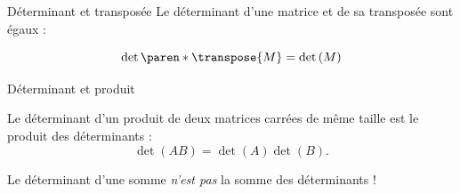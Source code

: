 \begin{frame}{Déterminant et transposée}
  Le déterminant d'une matrice et de sa transposée sont égaux :
  \begin{proposition}
    \begin{equation*}
      \det\paren*{\transpose{M}} = \det{(M)}
    \end{equation*}
  \end{proposition}
\end{frame}
\begin{frame}{Déterminant et produit}
  \begin{proposition}
    Le déterminant d'un produit de deux matrices carrées de même taille est le produit des déterminants :
    \begin{equation*}
      \det(AB) = \det(A)\det(B).
    \end{equation*}
  \end{proposition}\pause{}
  \begin{remark*}
    Le déterminant d'une somme \emph{n'est pas} la somme des déterminants !
  \end{remark*}
\end{frame}


